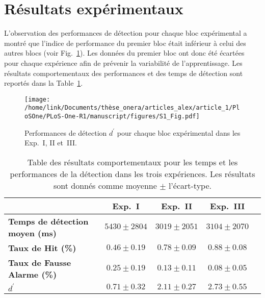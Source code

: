 \section{Résultats expérimentaux}
\label{chapitre4resultats}

L'observation des performances de détection pour chaque bloc expérimental a montré que l'indice de performance du premier bloc était inférieur à celui des autres blocs (voir Fig.~\ref{fig:dprime_bloc}). 
Les données du premier bloc ont donc été écartées pour chaque expérience afin de prévenir la variabilité de l'apprentissage. 
Les résultats comportementaux des performances et des temps de détection sont reportés dans la Table~\ref{tab:detection_time}. 

\begin{figure}[!t]
\centering
\texttt{[image: /home/link/Documents/thèse\_onera/articles\_alex/article\_1/PloSOne/PLoS-One-R1/manuscript/figures/S1\_Fig.pdf]}
\caption[Performances de détection $d^\prime$ pour chaque bloc expérimental des trois expériences]{Performances de détection $d^\prime$ pour chaque bloc expérimental dans les Exp.~I, II et~III.} 
\label{fig:dprime_bloc} 
\end{figure}

\begin{table}[!t]
\caption[Table des résultats comportementaux pour les temps et les performances de la détection de l'Étude 1]{Table des résultats comportementaux pour les temps et les performances de la détection dans les trois expériences. Les résultats sont donnés comme moyenne $\pm$ l'écart-type.}
\label{tab:detection_time}
\footnotesize
\centering
\begin{tabular}{|l||*{4}{c|}}
\hline
& \textbf{Exp.~I} & \textbf{Exp.~II} & \textbf{Exp.~III} \\
\hline
\textbf{Temps de détection moyen (ms)}  & $5430 \pm 2804$  & $3019 \pm 2051$ & $3104 \pm 2070$  \\
\textbf{Taux de Hit (\%)} & $0.46 \pm 0.19$ & $0.78 \pm 0.09 $ & $0.88 \pm 0.08$   \\
\textbf{Taux de Fausse Alarme (\%)} & $0.25 \pm 0.19 $ & $0.13 \pm 0.11$ & $0.08 \pm 0.05$  \\
\textbf{$d^\prime$} & $0.71 \pm 0.32 $ & $2.11 \pm 0.27$ & $2.73 \pm 0.55$  \\
\hline
\end{tabular} 
\end{table}

